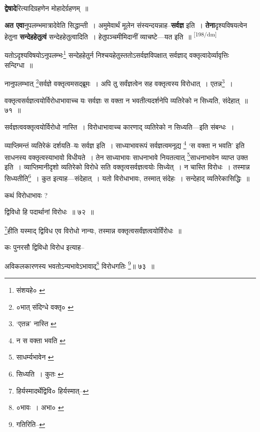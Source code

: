 \documentclass[article,12pt,a4paper]{memoir}
\begin{document}
	  \pstart \textbf{द्वेषादे}रित्यादिग्रहणेन मोहादेर्ग्रहणम् ॥
	\pend
      

	  \pstart \textbf{अत एवा}नुपलम्भमात्रादेवेति सिद्धान्ती । अमुमेवार्थं मूलेन संस्यन्दयन्नाह--\textbf{सर्वज्ञ} इति । \textbf{तेना}दृश्यविषयत्वेन हेतुना \textbf{सन्देहहेतुत्वं} सन्देहहेतुत्वादिति । हेतुपञ्चमीमिदानीं व्याचष्टे—यत इति ॥
	\pend
      \leavevmode\textsuperscript{\rmlatinfont\tiny [198/dm]}

	  \pstart यतोऽदृश्यविषयोऽनुपलम्भः\footnote{संशयहे० \cite{dp-msA} \cite{dp-edP} \cite{dp-edH} \cite{dp-edE} \cite{dp-edN}} सन्देहहेतुर्न निश्चयहेतुस्ततोऽसर्वज्ञविपक्षात् सर्वज्ञाद् वक्तृत्वादेर्व्यावृत्तिः सन्दिग्धा ॥
	\pend
       

	  \pstart नानुपलम्भात् \footnote{०भात् संदिग्धे वक्तृ० \cite{dp-msB}}सर्वज्ञे वक्तृत्वमसद्ब्रूमः । अपि तु सर्वंज्ञत्वेन सह वक्तृत्वस्य विरोधात् । एतन्न\footnote{‘एतन्न’ नास्ति \cite{dp-edE}} ।
	\pend
       

	  \pstart वक्तृत्वसर्वज्ञत्वयोर्विरोधाभावाच्च यः सर्वज्ञः स वक्ता न भवतीत्यदर्शनेपि व्यतिरेको न सिध्यति, संदेहात् ॥ ७१ ॥
	\pend
       

	  \pstart सर्वज्ञत्ववक्तृत्वयोर्विरोधो नास्ति । विरोधाभावाच्च कारणाद् व्यतिरेको न सिध्यति—इति संबन्धः ।
	\pend
       

	  \pstart व्याप्तिमन्तं व्यतिरेकं दर्शयति--यः सर्वज्ञ इति । साध्याभावरूपं सर्वज्ञत्वमनूद्य \footnote{न स वक्ता भवति \cite{dp-msA} \cite{dp-edP} \cite{dp-edH} \cite{dp-edE} \cite{dp-edN}} ‘स वक्ता न भवति’ इति साधनस्य वक्तृत्वस्याभावो विधीयते । तेन साध्याभावः साधनाभावे नियतत्वात् \footnote{साधर्म्यभावेन \cite{dp-msB}}साधनाभावेन व्याप्त उक्त इति । व्याप्तिमानीदृशो व्यतिरेको विरोधे सति वक्तृत्वसर्वज्ञत्वयोः सिध्येत् । न चास्ति विरोधः । तस्मान्न सिध्यतीति\footnote{सिध्यति । कुतः \cite{dp-msA} \cite{dp-edP} \cite{dp-edH} \cite{dp-edE} \cite{dp-edN}} । कुत इत्याह—संदेहात् । यतो विरोधाभावः, तस्मात् संदेहः । सन्देहाद् व्यतिरेकासिद्धिः ॥
	\pend
       

	  \pstart कथं विरोधाभावः ?
	\pend
       

	  \pstart द्विविधो हि पदार्थानां विरोधः ॥ ७२ ॥
	\pend
       

	  \pstart \footnote{हिर्यस्मादर्थेद्विवि० \cite{dp-msD} हिर्यस्मात्--\cite{dp-msB}}हीति यस्माद् द्विविध एव विरोधो नान्यः, तस्मान्न वक्तृत्वसर्वंज्ञत्वयोर्विंरोधः ॥
	\pend
       

	  \pstart कः पुनरसौ द्विविधो विरोध इत्याह--
	\pend
       

	  \pstart अविकलकारणस्य भवतोऽन्यभावेऽभावाद्\footnote{०भावः । अभा० \cite{dp-msB} \cite{dp-edP} \cite{dp-edH}} विरोधगतिः \footnote{गतिरिति--\cite{dp-msC}}॥ ७३ ॥
	\pend
       
\end{document}
